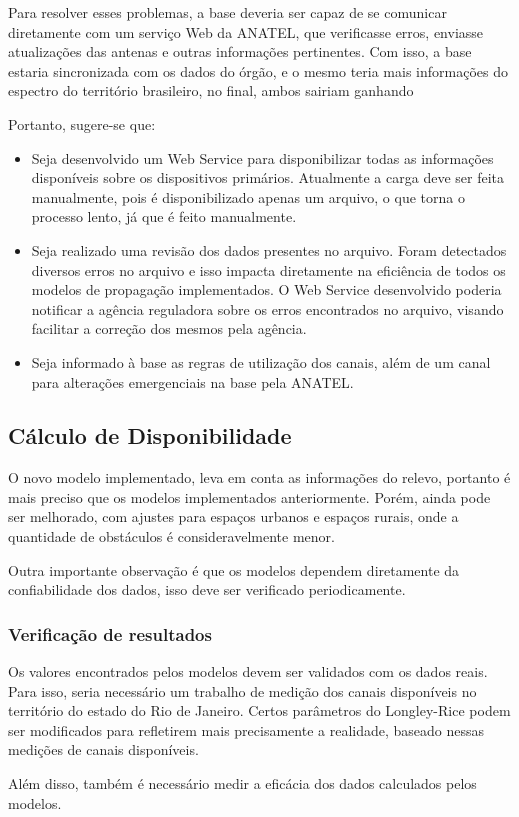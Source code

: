 Para resolver esses problemas, a base deveria ser capaz de se comunicar diretamente com um serviço Web da ANATEL, que verificasse erros, enviasse atualizações das antenas e outras informações pertinentes. Com isso, a base estaria sincronizada com os dados do órgão, e o mesmo teria mais informações do espectro do território brasileiro, no final, ambos sairiam ganhando

Portanto, sugere-se que:

\begin{itemize}
\item Seja desenvolvido um Web Service para disponibilizar todas as informações disponíveis sobre os dispositivos primários. Atualmente a carga deve ser feita manualmente, pois é disponibilizado apenas um arquivo, o que torna o processo lento, já que é feito manualmente.
\item Seja realizado uma revisão dos dados presentes no arquivo. Foram detectados diversos erros no arquivo e isso impacta diretamente na eficiência de todos os modelos de propagação implementados. O Web Service desenvolvido poderia notificar a agência reguladora sobre os erros encontrados no arquivo, visando facilitar a correção dos mesmos pela agência.
\item Seja informado à base as regras de utilização dos canais, além de um canal para alterações emergenciais na base pela ANATEL.
\end{itemize}


\subsection{Cálculo de Disponibilidade}

O novo modelo implementado, leva em conta as informações do relevo, portanto é mais preciso que os modelos implementados anteriormente. Porém, ainda pode ser melhorado, com ajustes para espaços urbanos e espaços rurais, onde a quantidade de obstáculos é consideravelmente menor.

Outra importante observação é que os modelos dependem diretamente da confiabilidade dos dados, isso deve ser verificado periodicamente.

\subsubsection{Verificação de resultados}

Os valores encontrados pelos modelos devem ser validados com os dados reais. Para isso, seria necessário um trabalho de medição dos canais disponíveis no território do estado do Rio de Janeiro. Certos parâmetros do Longley-Rice podem ser modificados para refletirem mais precisamente a realidade, baseado nessas medições de canais disponíveis.

Além disso, também é necessário medir a eficácia dos dados calculados pelos modelos.











